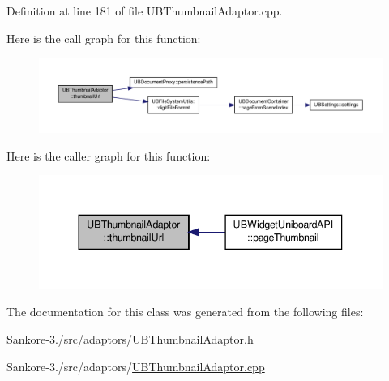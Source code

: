 Definition at line 181 of file U\-B\-Thumbnail\-Adaptor.\-cpp.



Here is the call graph for this function\-:
\nopagebreak
\begin{figure}[H]
\begin{center}
\leavevmode
\includegraphics[width=350pt]{d0/d06/class_u_b_thumbnail_adaptor_a2b61087433cc3b1b78b6ccfed61de9e3_cgraph}
\end{center}
\end{figure}




Here is the caller graph for this function\-:
\nopagebreak
\begin{figure}[H]
\begin{center}
\leavevmode
\includegraphics[width=344pt]{d0/d06/class_u_b_thumbnail_adaptor_a2b61087433cc3b1b78b6ccfed61de9e3_icgraph}
\end{center}
\end{figure}




The documentation for this class was generated from the following files\-:\begin{DoxyCompactItemize}
\item 
Sankore-\/3./src/adaptors/\hyperlink{_u_b_thumbnail_adaptor_8h}{U\-B\-Thumbnail\-Adaptor.\-h}\item 
Sankore-\/3./src/adaptors/\hyperlink{_u_b_thumbnail_adaptor_8cpp}{U\-B\-Thumbnail\-Adaptor.\-cpp}\end{DoxyCompactItemize}
